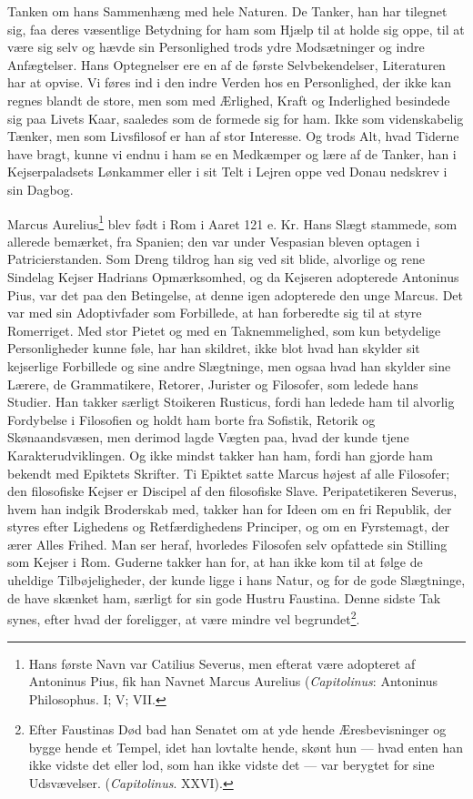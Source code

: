 \documentclass[12pt,a4paper,openany]{book}
\newcommand{\opage}[1]{\marginnote{\footnotesize\textit{[#1]}}}
\begin{document}
Tanken om hans Sammenhæng med hele Naturen. De Tanker,
han har tilegnet sig, faa deres væsentlige Betydning for ham
som Hjælp til at holde sig oppe, til at være sig selv og hævde
sin Personlighed trods ydre Modsætninger og indre Anfægtelser.
Hans Optegnelser ere en af de første Selvbekendelser, Literaturen
har at opvise. Vi føres ind i den indre Verden hos
en Personlighed, der ikke kan regnes blandt de store, men
som med Ærlighed, Kraft og Inderlighed besindede sig paa
Livets Kaar, saaledes som de formede sig for ham. Ikke som
videnskabelig Tænker, men som Livsfilosof er han af stor Interesse.
Og trods Alt, hvad Tiderne have bragt, kunne vi
endnu i ham se en Medkæmper og lære af de Tanker, han i
Kejserpaladsets Lønkammer eller i sit Telt i Lejren oppe ved
Donau nedskrev i sin Dagbog.

\setcounter{footnote}{0}%
\opage{109}Marcus Aurelius\footnote[1]{Hans første Navn var Catilius Severus, men efterat være adopteret af Antoninus Pius, fik han Navnet Marcus Aurelius (\emph{Capitolinus}: Antoninus Philosophus. I; V; VII.} blev født i Rom i Aaret 121 e. Kr.
Hans Slægt stammede, som allerede bemærket, fra Spanien;
den var under Vespasian bleven optagen i Patricierstanden.
Som Dreng tildrog han sig ved sit blide, alvorlige og rene
Sindelag Kejser Hadrians Opmærksomhed, og da Kejseren adopterede
Antoninus Pius, var det paa den Betingelse, at denne
igen adopterede den unge Marcus. Det var med sin Adoptivfader
som Forbillede, at han forberedte sig til at styre Romerriget.
Med stor Pietet og med en Taknemmelighed, som kun
betydelige Personligheder kunne føle, har han skildret, ikke
blot hvad han skylder sit kejserlige Forbillede og sine andre
Slægtninge, men ogsaa hvad han skylder sine Lærere, de Grammatikere,
Retorer, Jurister og Filosofer, som ledede hans Studier.
Han takker særligt Stoikeren Rusticus, fordi han ledede ham
til alvorlig Fordybelse i Filosofien og holdt ham borte fra
Sofistik, Retorik og Skønaandsvæsen, men derimod lagde Vægten
paa, hvad der kunde tjene Karakterudviklingen. Og ikke
mindst takker han ham, fordi han gjorde ham bekendt med
Epiktets Skrifter. Ti Epiktet satte Marcus højest af alle Filosofer;
den filosofiske Kejser er Discipel af den filosofiske Slave.
Peripatetikeren Severus, hvem han indgik Broderskab med,
takker han for Ideen om en fri Republik, der styres efter Lighedens
og Retfærdighedens Principer, og om en Fyrstemagt,
der ærer Alles Frihed. Man ser heraf, hvorledes Filosofen
selv opfattede sin Stilling som Kejser i Rom. Guderne takker
han for, at han ikke kom til at følge de uheldige Tilbøjeligheder,
der kunde ligge i hans Natur, og for de gode Slægtninge,
de have skænket ham, særligt for sin gode Hustru
Faustina. Denne sidste Tak synes, efter hvad der foreligger,
at være mindre vel begrundet\footnote[2]{Efter Faustinas Død bad han Senatet om at yde hende Æresbevisninger og bygge hende et Tempel, idet han lovtalte hende, skønt hun --- hvad enten han ikke vidste det eller lod, som han ikke vidste det --- var berygtet for sine Udsvævelser. (\emph{Capitolinus}. XXVI).}.
\end{document}
